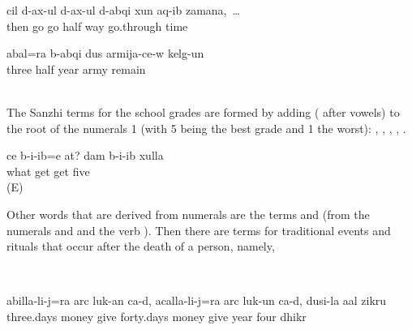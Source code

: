 \ea\label{ex:thentheywentandwent}
\gll	c{\ej}il d-ax-ul d-ax-ul	d-abq{\ej}i x{\lmk}un aq-ib	zamana,~\ldots\\
	then go go	half way go.through	time\\
\glt	{}
\z

\ea\label{ex:hespentthreeandahalfyears}
\gll	{\eppl}a{\pha}bal=ra	b-abq{\ej}i	dus	{\eppl}a{\pha}rmija-c{\lmk}e-w	kelg-un\\
	three	half	year	army	remain\\
\glt‎‎	
\z

The Sanzhi terms for the school grades are formed by adding  ( after vowels) to the root of the numerals 1 (with 5 being the best grade and 1 the worst):  ,  ,  ,  ,   . 

\ea\label{ex:whatgradedidyougetIgotafive}
\gll	ce	b-i{\paaf}-ib=e	at?	dam	b-i{\paaf}-ib	xulla\\
	what	get			get	five\\
\glt	{} (E)
\z

Other words that are derived from numerals are the terms   and   (from the numerals  and  and the verb  ). Then there are terms for traditional events and rituals that occur after the death of a person, namely, 
%
\begin{exe}
	\ex	\label{ex:daysafterdeath}
		\TabPositions{12em}
					 \tab {}		 \\
			 \tab 	{}				
\end{exe}

\ea\label{ex:afterthreedayspeoplegivealms}
\gll	{\eppl}a{\pha}billa-li-j=ra	arc luk{\lmk}-an ca-d,	a{\vuvfr}{\lab}c{\ej}alla-li-j=ra	arc	luk{\lmk}-un ca-d,		dus{\lmk}i-la	a{\vuvfr}{\lab}al	zikru\\
	three.days	money give 	forty.days	money	give 	year	four	dhikr\\
\glt	{}
\z


